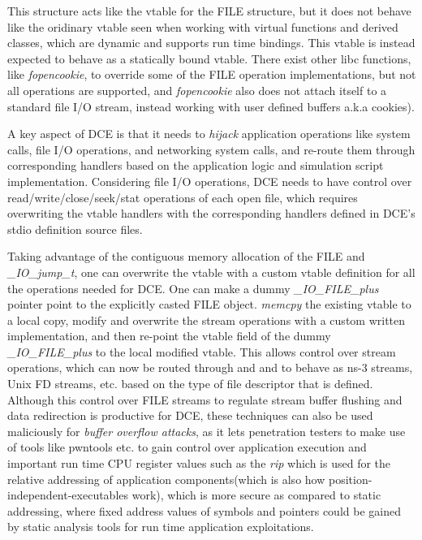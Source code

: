 \documentclass{sig-alternate}
\begin{document}
This structure acts like the vtable for the FILE structure, but it does not behave like the oridinary vtable seen when working with virtual functions 
and derived classes, which are dynamic and supports run time bindings. This vtable is instead expected to behave as a statically bound vtable.  There exist 
other libc functions, like \textit{fopencookie}, to override some of the FILE operation implementations, but not all operations are supported, and 
\textit{fopencookie} also does not attach itself to a standard file I/O stream, 
instead working with user defined buffers a.k.a cookies). 

A key aspect of DCE is that it needs to \textit{hijack}
application operations like system calls, file I/O operations, and networking
system calls, and re-route them through 
corresponding handlers based on the application logic and simulation script implementation. Considering file I/O operations, DCE needs to have control 
over read/write/close/seek/stat operations of each open file, which requires
overwriting the vtable handlers with the corresponding handlers defined 
in DCE's stdio definition source files. 

Taking advantage of the contiguous memory allocation of the FILE and \textit{\_IO\_jump\_t}, one can overwrite the vtable with a custom vtable definition for all the operations needed for DCE. One can make a dummy \textit{\_IO\_FILE\_plus} 
pointer point to the explicitly casted FILE object. \textit{memcpy} the existing vtable to a local copy, modify and overwrite the stream operations with a 
custom written implementation, and then re-point the vtable field of the dummy \textit{\_IO\_FILE\_plus} to the local modified vtable.  This allows
control over stream operations, which can now be routed through and and to behave as ns-3 streams, Unix FD streams, etc. based on the type of file 
descriptor that is defined.  Although this control over FILE streams
to regulate stream buffer flushing and data redirection is productive for
DCE, these techniques can also be used maliciously for
\textit{buffer overflow attacks}, as it lets penetration 
testers to make use of tools like pwntools etc. to gain control over application execution and important run time CPU register values such as the 
\textit{rip} which is used for the relative addressing of application components(which is also how position-independent-executables work), which is more 
secure as compared to static addressing, where fixed address values of symbols and pointers could be gained by static analysis tools for run 
time application exploitations.
\end{document}
